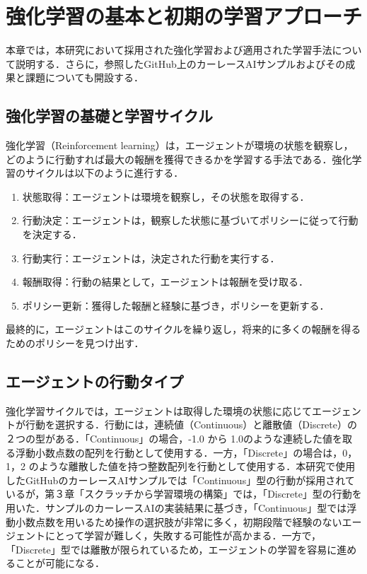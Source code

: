 \section{強化学習の基本と初期の学習アプローチ}
本章では，本研究において採用された強化学習および適用された学習手法について説明する．さらに，参照したGitHub上のカーレースAIサンプルおよびその成果と課題についても開設する．
\subsection{強化学習の基礎と学習サイクル}
強化学習（Reinforcement learning）は，エージェントが環境の状態を観察し，どのように行動すれば最大の報酬を獲得できるかを学習する手法である．強化学習のサイクルは以下のように進行する．
\begin{enumerate}
  \item 状態取得：エージェントは環境を観察し，その状態を取得する．
  \item 行動決定：エージェントは，観察した状態に基づいてポリシーに従って行動を決定する．
  \item 行動実行：エージェントは，決定された行動を実行する．
  \item 報酬取得：行動の結果として，エージェントは報酬を受け取る．
  \item ポリシー更新：獲得した報酬と経験に基づき，ポリシーを更新する．
\end{enumerate}

最終的に，エージェントはこのサイクルを繰り返し，将来的に多くの報酬を得るためのポリシーを見つけ出す．

\subsection{エージェントの行動タイプ} 
強化学習サイクルでは，エージェントは取得した環境の状態に応じてエージェントが行動を選択する．行動には，連続値（Continuous）と離散値（Discrete）の２つの型がある．「Continuous」の場合，-1.0 から 1.0のような連続した値を取る浮動小数点数の配列を行動として使用する．一方，「Discrete」の場合は，0，1，2 のような離散した値を持つ整数配列を行動として使用する．本研究で使用したGitHubのカーレースAIサンプルでは「Continuous」型の行動が採用されているが，第３章「スクラッチから学習環境の構築」では，「Discrete」型の行動を用いた．サンプルのカーレースAIの実装結果に基づき，「Continuous」型では浮動小数点数を用いるため操作の選択肢が非常に多く，初期段階で経験のないエージェントにとって学習が難しく，失敗する可能性が高かまる．一方で，「Discrete」型では離散が限られているため，エージェントの学習を容易に進めることが可能になる．


